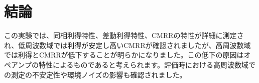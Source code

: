 \documentclass[a4paper,11pt,xelatex,ja=standard]{bxjsarticle}
\begin{document}
\section{結論}
    この実験では、同相利得特性、差動利得特性、CMRRの特性が詳細に測定され、低周波数域では利得が安定し高いCMRRが確認されましたが、高周波数域では利得とCMRRが低下することが明らかになりました。この低下の原因はオペアンプの特性によるものであると考えられます。評価時における高周波数域での測定の不安定性や環境ノイズの影響も確認されました。
\end{document}
